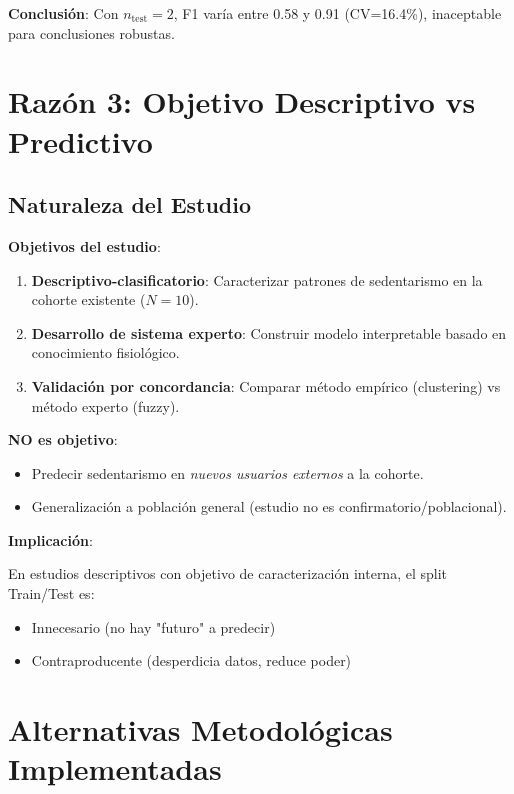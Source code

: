 \documentclass[12pt,letterpaper,twoside]{report}
\begin{document}
\begin{calculobox}
\begin{calculobox}
\textbf{Conclusión}: Con $n_{\text{test}}=2$, F1 varía entre 0.58 y 0.91 (CV=16.4\%), inaceptable para conclusiones robustas.
\end{calculobox}

\section{Razón 3: Objetivo Descriptivo vs Predictivo}

\subsection{Naturaleza del Estudio}

\begin{reglabox}
\textbf{Objetivos del estudio}:

\begin{enumerate}[noitemsep]
    \item \textbf{Descriptivo-clasificatorio}: Caracterizar patrones de sedentarismo en la cohorte existente ($N=10$).
    \item \textbf{Desarrollo de sistema experto}: Construir modelo interpretable basado en conocimiento fisiológico.
    \item \textbf{Validación por concordancia}: Comparar método empírico (clustering) vs método experto (fuzzy).
\end{enumerate}

\textbf{NO es objetivo}:
\begin{itemize}[noitemsep]
    \item Predecir sedentarismo en \textit{nuevos usuarios externos} a la cohorte.
    \item Generalización a población general (estudio no es confirmatorio/poblacional).
\end{itemize}

\textbf{Implicación}:

En estudios descriptivos con objetivo de caracterización interna, el split Train/Test es:
\begin{itemize}[noitemsep]
    \item Innecesario (no hay "futuro" a predecir)
    \item Contraproducente (desperdicia datos, reduce poder)
\end{itemize}
\end{reglabox}

\section{Alternativas Metodológicas Implementadas}


\end{calculobox}
\end{document}
